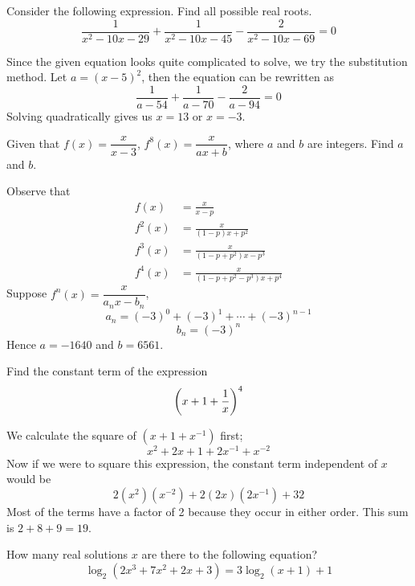 \begin{prbm}
Consider the following expression. Find all possible real roots.
\[ \frac{1}{x^2-10x-29}+\frac{1}{x^2-10x-45} - \frac{2}{x^2-10x-69}=0 \]
\end{prbm}

\begin{solution}
Since the given equation looks quite complicated to solve, we try the substitution method. Let $a=(x-5)^2$, then the equation can be rewritten as
\[ \frac{1}{a-54}+\frac{1}{a-70} - \frac{2}{a-94}=0 \]
Solving quadratically gives us $\boxed{x=13}$ or $\boxed{x=-3}$.
\end{solution}
\pagebreak

\begin{prbm}[DOKA]
Given that $f(x)=\dfrac{x}{x-3}$,  $f^8(x)=\dfrac{x}{ax+b}$, where $a$ and $b$ are integers. Find $a$ and $b$.
\end{prbm}

\begin{solution}
Observe that 
\begin{align*}
f(x) &= \frac{x}{x-p} \\
f^2(x) &= \frac{x}{(1-p)x+p^2} \\
f^3(x) &= \frac{x}{(1-p+p^2)x-p^3} \\
f^4(x) &= \frac{x}{(1-p+p^2-p^3)x+p^4}
\end{align*}
Suppose $f^n(x)=\dfrac{x}{a_nx-b_n}$, 
\[ a_n=(-3)^0+(-3)^1+\cdots+(-3)^{n-1} \]
\[ b_n=(-3)^n \]
Hence $\boxed{a=-1640}$ and $\boxed{b=6561}$.
\end{solution}
\pagebreak

\begin{prbm}
Find the constant term of the expression
\[\left(x+1+\frac{1}{x}\right)^4\]
\end{prbm}

\begin{solution}
We calculate the square of $(x+1+x^{-1})$ first;
\[ x^2+2x+1+2x^{-1}+x^{-2} \]
Now if we were to square this expression, the constant term independent of $x$ would be
\[ 2(x^2)(x^{-2})+2(2x)(2x^{-1})+32 \]
Most of the terms have a factor of 2 because they occur in either order. This sum is $2+8+9=\boxed{19}$.
\end{solution}
\pagebreak

\begin{prbm}
How many real solutions $x$ are there to the following equation?
\[ \log_2(2x^3+7x^2+2x+3)=3\log_2(x+1)+ 1 \]
\end{prbm}

